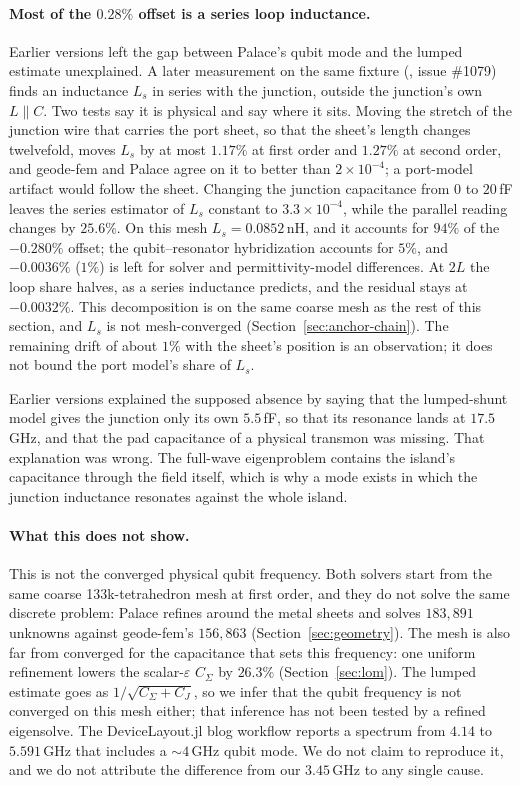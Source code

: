 \documentclass{anvil-paper}
\begin{document}
\paragraph{Most of the $0.28\%$ offset is a series loop inductance.}
Earlier versions left the gap between Palace's qubit mode and the lumped
estimate unexplained. A later measurement on the same fixture
(, issue \#1079)
finds an inductance $L_s$ in series with the junction, outside the
junction's own $L \parallel C$. Two tests say it is physical and say
where it sits. Moving the stretch of the junction wire that carries the
port sheet, so that the sheet's length changes twelvefold, moves $L_s$
by at most $1.17\%$ at first order and $1.27\%$ at second order, and
geode-fem and Palace agree on it to better than $2\times10^{-4}$; a
port-model artifact would follow the sheet. Changing the junction
capacitance from $0$ to $20$\,fF leaves the series estimator of $L_s$
constant to $3.3\times10^{-4}$, while the parallel reading changes by
$25.6\%$. On this mesh $L_s = 0.0852$\,nH, and it accounts for $94\%$ of
the $-0.280\%$ offset; the qubit--resonator hybridization accounts for
$5\%$, and $-0.0036\%$ ($1\%$) is left for solver and
permittivity-model differences. At $2L$ the loop share halves, as a
series inductance predicts, and the residual stays at $-0.0032\%$. This
decomposition is on the same coarse mesh as the rest of this section,
and $L_s$ is not mesh-converged (Section~\ref{sec:anchor-chain}). The
remaining drift of about $1\%$ with the sheet's position is an
observation; it does not bound the port model's share of $L_s$.

Earlier versions explained the supposed absence by saying that the
lumped-shunt model gives the junction only its own $5.5$\,fF, so that its
resonance lands at $17.5$\,GHz, and that the pad capacitance of a
physical transmon \citep{koch2007} was missing. That explanation was
wrong. The full-wave eigenproblem contains the island's capacitance
through the field itself, which is why a mode exists in which the
junction inductance resonates against the whole island.

\paragraph{What this does not show.}
This is not the converged physical qubit frequency. Both solvers start
from the same coarse 133k-tetrahedron mesh at first order, and they do
not solve the same discrete problem: Palace refines around the metal
sheets and solves $183{,}891$ unknowns against geode-fem's $156{,}863$
(Section~\ref{sec:geometry}). The mesh is also far from converged for
the capacitance that sets this frequency: one uniform refinement lowers
the scalar-$\varepsilon$ $C_\Sigma$ by $26.3\%$
(Section~\ref{sec:lom}). The lumped estimate goes as
$1/\sqrt{C_\Sigma + C_J}$, so we infer that the qubit frequency is not
converged on this mesh either; that inference has not been tested by a
refined eigensolve. The DeviceLayout.jl blog workflow
\citep{devicelayout-blog} reports a spectrum from $4.14$ to
$5.591$\,GHz that includes a ${\sim}4$\,GHz qubit mode. We do not claim
to reproduce it, and we do not attribute the difference from our
$3.45$\,GHz to any single cause.
\end{document}
